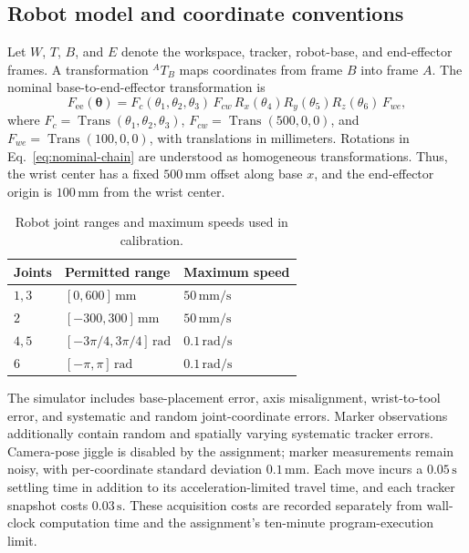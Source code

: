 \subsection{Robot model and coordinate conventions}

Let $W$, $T$, $B$, and $E$ denote the workspace, tracker, robot-base, and
end-effector frames. A transformation ${}^{A}T_{B}$ maps coordinates from
frame $B$ into frame $A$. The nominal base-to-end-effector transformation is
\begin{equation}
 F_{\mathrm{ee}}(\boldsymbol{\theta})
 =F_c(\theta_1,\theta_2,\theta_3)\,F_{cw}\,
   R_x(\theta_4)R_y(\theta_5)R_z(\theta_6)\,F_{we},
 \label{eq:nominal-chain}
\end{equation}
where $F_c=\operatorname{Trans}(\theta_1,\theta_2,\theta_3)$,
$F_{cw}=\operatorname{Trans}(500,0,0)$, and
$F_{we}=\operatorname{Trans}(100,0,0)$, with translations in millimeters.
Rotations in Eq.~\eqref{eq:nominal-chain} are understood as homogeneous
transformations. Thus, the wrist center has a fixed $500\,\mathrm{mm}$
offset along base $x$, and the end-effector origin is
$100\,\mathrm{mm}$ from the wrist center.

\begin{table}[htbp]
 \centering
 \caption{Robot joint ranges and maximum speeds used in calibration.}
 \label{tab:joint-specifications}
 \begin{tabular}{lll}
  \toprule
  Joints & Permitted range & Maximum speed \\
  \midrule
  $1,3$ & $[0,600]\,\mathrm{mm}$ & $50\,\mathrm{mm/s}$ \\
  $2$ & $[-300,300]\,\mathrm{mm}$ & $50\,\mathrm{mm/s}$ \\
  $4,5$ & $[-3\pi/4,3\pi/4]\,\mathrm{rad}$ & $0.1\,\mathrm{rad/s}$ \\
  $6$ & $[-\pi,\pi]\,\mathrm{rad}$ & $0.1\,\mathrm{rad/s}$ \\
  \bottomrule
 \end{tabular}
\end{table}

The simulator includes base-placement error, axis misalignment,
wrist-to-tool error, and systematic and random joint-coordinate errors.
Marker observations additionally contain random and spatially varying
systematic tracker errors. Camera-pose jiggle is disabled by the
assignment; marker measurements remain noisy, with per-coordinate
standard deviation $0.1\,\mathrm{mm}$. Each move incurs a
$0.05\,\mathrm{s}$ settling time in addition to its acceleration-limited
travel time, and each tracker snapshot costs $0.03\,\mathrm{s}$.
These acquisition costs are recorded separately from wall-clock
computation time and the assignment's ten-minute program-execution limit.

